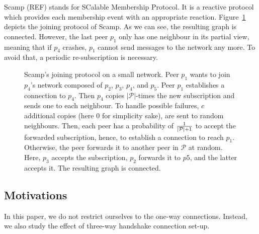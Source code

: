 \begin{asparadesc}
\item [Scamp] (REF) stands for SCalable Membership Protocol. It is a reactive
  protocol which provides each membership event with an appropriate reaction.
  Figure~\ref{fig:scampexample} depicts the joining protocol of Scamp. As we
  can see, the resulting graph is connected. However, the last peer $p_1$ only
  has one neighbour in its partial view, meaning that if $p_4$ crashes, $p_1$
  cannot send messages to the network any more. To avoid that, a periodic
  re-subscription is necessary.
\end{asparadesc}

\begin{figure}
  \centering
  
  \caption{\label{fig:scampexample} Scamp's joining protocol on a small
    network. Peer $p_1$ wants to join $p_4$'s network composed of $p_2$,
    $p_3$, $p_4$, and $p_5$. Peer $p_1$ establishes a connection to $p_4$. Then
    $p_4$ copies $|\mathcal{P}|$-times the new subscription and sends one to
    each neighbour. To handle possible failures, $c$ additional copies (here
    $0$ for simplicity sake), are sent to random neighbours. Then, each peer
    has a probability of $1\over{|\mathcal{P}|+1}$ to accept the forwarded
    subscription, hence, to establish a connection to reach $p_1$. Otherwise,
    the peer forwards it to another peer in $\mathcal{P}$ at random. Here,
    $p_3$ accepts the subscription, $p_2$ forwards it to $p5$, and the latter
    accepts it. The resulting graph is connected.}
\end{figure}

\subsection{Motivations}
In this paper, we do not restrict ourselves to the one-way connections. Instead,
we also study the effect of three-way handshake connection set-up. 


